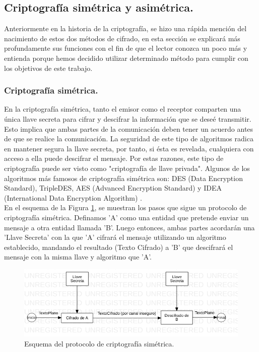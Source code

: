 \documentclass[12pt, a4paper, titlepage]{report}
\begin{document}
            \subsection{Criptografía simétrica y asimétrica.}
                Anteriormente en la historia de la criptografía, se hizo una rápida mención del nacimiento de estos dos métodos de cifrado, en esta sección se explicará más profundamente sus funciones con el fin de que el lector conozca un poco más y entienda porque hemos decidido utilizar determinado método para cumplir con los objetivos de este trabajo.
                
                \subsubsection{Criptografía simétrica.}
                En la criptografía simétrica, tanto el emisor como el receptor comparten una única llave secreta para cifrar y descifrar la información que se deseé transmitir. Esto implica que ambas partes de la comunicación deben tener un acuerdo antes de que se realice la comunicación. La seguridad de este tipo de algoritmos radica en mantener segura la llave secreta, por tanto, si ésta es revelada, cualquiera con acceso a ella puede descifrar el mensaje. Por estas razones, este tipo de criptografía puede ser visto como "criptografía de llave privada". Algunos de los algoritmos más famosos de criptografía simétrica son: DES (Data Encryption Standard), TripleDES, AES (Advanced Encryption Standard) y IDEA (International Data Encryption Algorithm) \cite{refCriptografia}.\\
                En el esquema de la Figura \ref{fig:criptoSimetrica}, se muestran los pasos que sigue un protocolo de criptografía simétrica. Definamos 'A' como una entidad que pretende enviar un mensaje a otra entidad llamada 'B'. Luego entonces, ambas partes acordarán una 'Llave Secreta' con la que 'A' cifrará el mensaje utilizando un algoritmo establecido, mandando el resultado (Texto Cifrado) a 'B' que descifrará el mensaje con la misma llave y algoritmo que 'A'.
                
                \begin{figure}[H]
        			\begin{center}	                  \includegraphics[width=14cm]{./imagenes/MarcoTeorico/cripto_simetrica.png}
        				\caption{Esquema del protocolo de criptografía simétrica.}
        				\label{fig:criptoSimetrica}
        			\end{center}
        		\end{figure}
        		
\end{document}
